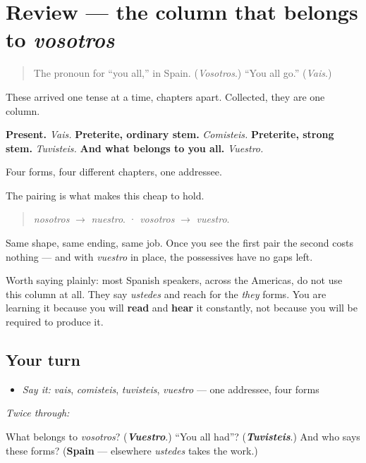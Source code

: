 \section[(review)]{Review — the column that belongs to \emph{vosotros}}

\label{lesson:ES-C65-repaso-columna-vosotros}



\begin{quote}
The pronoun for \textquotedblleft{}you all,\textquotedblright{} in Spain. (\emph{Vosotros}.) \textquotedblleft{}You all go.\textquotedblright{} (\emph{Vais}.)
\end{quote}

\begin{grammarlens}[title={What you've built}]
These arrived one tense at a time, chapters apart. Collected, they are one column.

\textbf{Present.} \emph{Vais.} \textbf{Preterite, ordinary stem.} \emph{Comisteis.} \textbf{Preterite, strong stem.} \emph{Tuvisteis.} \textbf{And what belongs to you all.} \emph{Vuestro.}

Four forms, four different chapters, one addressee.
\end{grammarlens}

\begin{culture}
The pairing is what makes this cheap to hold.

\begin{quote}
\emph{nosotros} $\to$ \emph{nuestro}.  ·  \emph{vosotros} $\to$ \emph{vuestro}.
\end{quote}

Same shape, same ending, same job. Once you see the first pair the second costs nothing — and with \emph{vuestro} in place, the possessives have no gaps left.

Worth saying plainly: most Spanish speakers, across the Americas, do not use this column at all. They say \emph{ustedes} and reach for the \emph{they} forms. You are learning it because you will \textbf{read} and \textbf{hear} it constantly, not because you will be required to produce it.
\end{culture}

\subsection*{Your turn}
\begin{itemize}
\raggedright
  \item \emph{Say it:} \emph{vais}, \emph{comisteis}, \emph{tuvisteis}, \emph{vuestro} — one addressee, four forms
\end{itemize}

\emph{Twice through:}

\begin{tcolorbox}[breakable,colback=teal!4,colframe=teal!35!black,title={Before you move on}]
What belongs to \emph{vosotros}? (\emph{\textbf{Vuestro}}.) \textquotedblleft{}You all had\textquotedblright{}? (\emph{\textbf{Tuvisteis}}.) And who says these forms? (\textbf{Spain} — elsewhere \emph{ustedes} takes the work.)
\end{tcolorbox}
